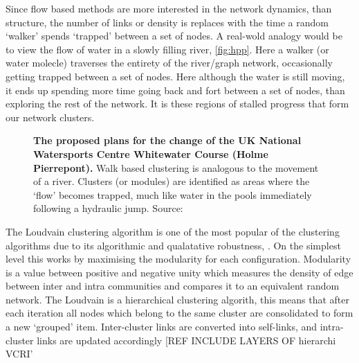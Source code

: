 Since flow based methods are more interested in the network dynamics, than structure, the number of links or density is replaces with the time a random `walker' spends `trapped' between a set of nodes. A real-wold analogy would be to view the flow of water in a slowly filling river, \autoref{fig:hpp}. Here a walker (or water molecle) traverses the entirety of the river/graph network, occasionally getting trapped between a set of nodes. Here although the water is still moving, it ends up spending more time going back and fort between a set of nodes, than exploring the rest of the network. It is these regions of stalled progress that form our network clusters.

\begin{figure}[H]
    \centering
\caption{\textbf{The proposed plans for the change of the UK National Watersports Centre Whitewater Course (Holme Pierrepont).} Walk based clustering is analogous to the movement of a river. Clusters (or modules) are identified as areas where the `flow' becomes trapped, much like water in the pools immediately following a hydraulic jump. Source: \cite{hpp} }\label{fig:hpp}
\end{figure}

The Loudvain clustering algorithm is one of the most popular of the clustering algorithms due to its algorithmic and qualatative robustness, \citep{loudvain,loudrobust}. On the simplest level this works by maximising the modularity for each configuration. Modularity is a value between positive and negative unity which measures the density of edge between inter and intra communities and compares it to an equivalent random network.
The Loudvain is a hierarchical clustering algorith, this means that after each iteration all nodes which belong to the same cluster are consolidated to form a new `grouped' item. Inter-cluster links are converted into self-links, and intra-cluster links are updated accordingly [REF INCLUDE LAYERS OF hierarchi VCRI'


